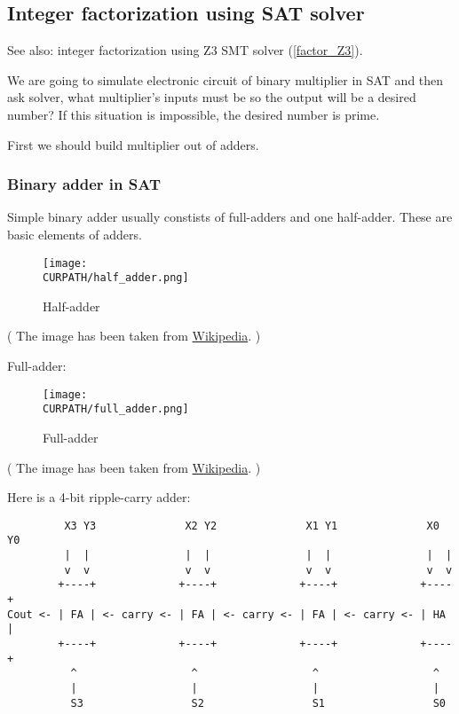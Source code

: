 \subsection{Integer factorization using SAT solver}
\label{factor_SAT}

\renewcommand{\CURPATH}{equations/factor_SAT}

See also: integer factorization using Z3 SMT solver (\ref{factor_Z3}).

We are going to simulate electronic circuit of binary multiplier in SAT and then ask solver, what multiplier's inputs must be so the output will be a desired number?
If this situation is impossible, the desired number is prime.

First we should build multiplier out of adders.

\subsubsection{Binary adder in SAT}

Simple binary adder usually constists of full-adders and one half-adder.
These are basic elements of adders.

\begin{figure}[H]
\centering
\texttt{[image: \\CURPATH/half\_adder.png]}
\caption{Half-adder}
\end{figure}

( The image has been taken from \href{https://en.wikipedia.org/wiki/Adder_(electronics)}{Wikipedia}. )

Full-adder:

\begin{figure}[H]
\centering
\texttt{[image: \\CURPATH/full\_adder.png]}
\caption{Full-adder}
\end{figure}

( The image has been taken from \href{https://en.wikipedia.org/wiki/Adder_(electronics)}{Wikipedia}. )

Here is a 4-bit ripple-carry adder:

\begin{lstlisting}
         X3 Y3              X2 Y2              X1 Y1              X0 Y0
         |  |               |  |               |  |               |  |
         v  v               v  v               v  v               v  v
        +----+             +----+             +----+             +----+
Cout <- | FA | <- carry <- | FA | <- carry <- | FA | <- carry <- | HA |
        +----+             +----+             +----+             +----+
          ^                  ^                  ^                  ^
          |                  |                  |                  |
          S3                 S2                 S1                 S0
\end{lstlisting}

